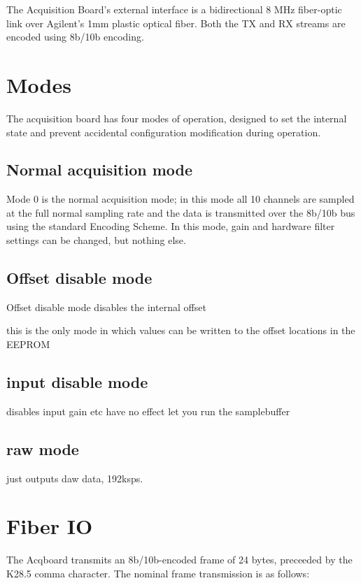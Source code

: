 

The Acquisition Board's external interface is a bidirectional 8 MHz fiber-optic link over Agilent's 1mm plastic optical fiber. Both the TX and RX streams are encoded using 8b/10b encoding. 

\section{Modes}
The acquisition board has four modes of operation, designed to set the internal state and prevent accidental configuration modification during operation. 

\subsection{Normal acquisition mode}
Mode 0 is the normal acquisition mode; in this mode all 10 channels are sampled at the full normal sampling rate and the data is transmitted over the 8b/10b bus using the standard Encoding Scheme. In this mode, gain and hardware filter settings can be changed, but nothing else. 

\subsection{Offset disable mode}
Offset disable mode disables the internal offset

this is the only mode in which values can be written to the offset locations in the EEPROM



\subsection{input disable mode}
disables input
gain etc have no effect
let you run the samplebuffer


\subsection{raw mode}
just outputs daw data, 192ksps.

\section{Fiber IO}
The Acqboard transmits an 8b/10b-encoded frame of 24 bytes, preceeded by the K28.5 comma character. The nominal frame transmission is as follows:

